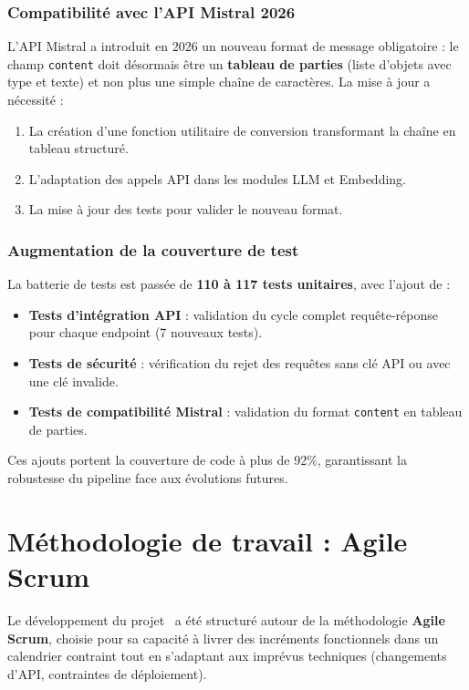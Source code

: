 \subsubsection{Compatibilité avec l'API Mistral 2026}

L'API Mistral a introduit en 2026 un nouveau format de message obligatoire : le champ \texttt{content} doit désormais être un \textbf{tableau de parties} (liste d'objets avec type et texte) et non plus une simple chaîne de caractères. La mise à jour a nécessité :

\begin{enumerate}
    \item La création d'une fonction utilitaire de conversion transformant la chaîne en tableau structuré.
    \item L'adaptation des appels API dans les modules LLM et Embedding.
    \item La mise à jour des tests pour valider le nouveau format.
\end{enumerate}

\subsubsection{Augmentation de la couverture de test}

La batterie de tests est passée de \textbf{110 à 117 tests unitaires}, avec l'ajout de :

\begin{itemize}
    \item \textbf{Tests d'intégration API} : validation du cycle complet requête-réponse pour chaque endpoint (7 nouveaux tests).
    \item \textbf{Tests de sécurité} : vérification du rejet des requêtes sans clé API ou avec une clé invalide.
    \item \textbf{Tests de compatibilité Mistral} : validation du format \texttt{content} en tableau de parties.
\end{itemize}

Ces ajouts portent la couverture de code à plus de 92\%, garantissant la robustesse du pipeline face aux évolutions futures.

\section{Méthodologie de travail : Agile Scrum}

Le développement du projet \AZIZA\ a été structuré autour de la méthodologie \textbf{Agile Scrum}, choisie pour sa capacité à livrer des incréments fonctionnels dans un calendrier contraint tout en s'adaptant aux imprévus techniques (changements d'API, contraintes de déploiement).

